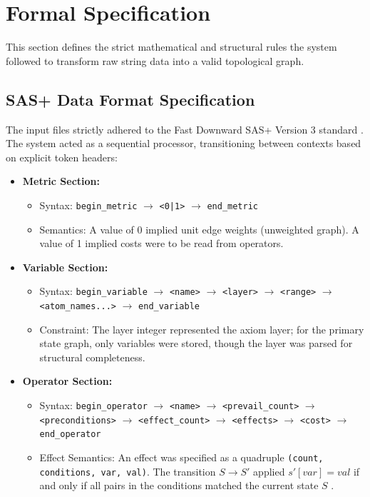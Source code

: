 \section{Formal Specification}
This section defines the strict mathematical and structural rules the system followed to transform raw string data into a valid topological graph.

\subsection{SAS+ Data Format Specification}
The input files strictly adhered to the Fast Downward SAS+ Version 3 standard \cite{fastdownward, sasdocs}. The system acted as a sequential processor, transitioning between contexts based on explicit token headers:

\begin{itemize}
    \item \textbf{Metric Section:}
    \begin{itemize}
        \item Syntax: \texttt{begin\_metric} $\to$ \texttt{<0|1>} $\to$ \texttt{end\_metric}
        \item Semantics: A value of 0 implied unit edge weights (unweighted graph). A value of 1 implied costs were to be read from operators.
    \end{itemize}
    
    \item \textbf{Variable Section:}
    \begin{itemize}
        \item Syntax: \texttt{begin\_variable} $\to$ \texttt{<name>} $\to$ \texttt{<layer>} $\to$ \texttt{<range>} $\to$ \texttt{<atom\_names...>} $\to$ \texttt{end\_variable}
        \item Constraint: The layer integer represented the axiom layer; for the primary state graph, only variables were stored, though the layer was parsed for structural completeness.
    \end{itemize}
    
    \item \textbf{Operator Section:}
    \begin{itemize}
        \item Syntax: \texttt{begin\_operator} $\to$ \texttt{<name>} $\to$ \texttt{<prevail\_count>} $\to$ \texttt{<preconditions>} $\to$ \texttt{<effect\_count>} $\to$ \texttt{<effects>} $\to$ \texttt{<cost>} $\to$ \texttt{end\_operator}
        \item Effect Semantics: An effect was specified as a quadruple \texttt{(count, conditions, var, val)}. The transition $S \to S'$ applied $s'[var] = val$ if and only if all pairs in the conditions matched the current state $S$ \cite{saslexer}.
    \end{itemize}
\end{itemize}

